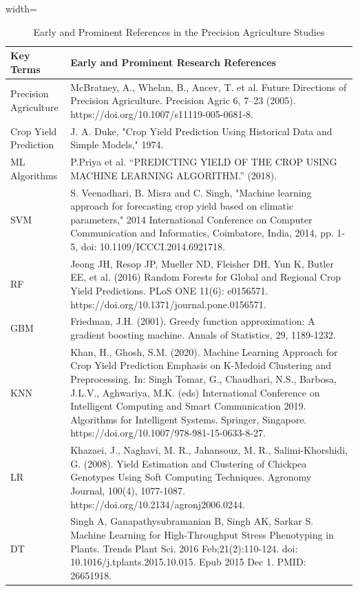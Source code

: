 \documentclass[conference]{IEEEtran}
\begin{document}
\begin{table}[htbp]
\centering
\caption{Early and Prominent References in the Precision Agriculture Studies}
\begin{adjustbox}{width=\textwidth}
\begin{tabular}{|p{2cm}|p{14cm}|}
\hline
\textbf{Key Terms} & \textbf{Early and Prominent Research References} \\
\hline
Precision Agriculture & McBratney, A., Whelan, B., Ancev, T. et al. Future Directions of Precision Agriculture. Precision Agric 6, 7–23 (2005). https://doi.org/10.1007/s11119-005-0681-8. \\
\hline
Crop Yield Prediction & J. A. Duke, "Crop Yield Prediction Using Historical Data and Simple Models," 1974. \\
\hline
ML Algorithms & P.Priya et al. “PREDICTING YIELD OF THE CROP USING MACHINE LEARNING ALGORITHM.” (2018).\\
\hline
SVM & S. Veenadhari, B. Misra and C. Singh, "Machine learning approach for forecasting crop yield based on climatic parameters," 2014 International Conference on Computer Communication and Informatics, Coimbatore, India, 2014, pp. 1-5, doi: 10.1109/ICCCI.2014.6921718.\\
\hline
RF & Jeong JH, Resop JP, Mueller ND, Fleisher DH, Yun K, Butler EE, et al. (2016) Random Forests for Global and Regional Crop Yield Predictions. PLoS ONE 11(6): e0156571. https://doi.org/10.1371/journal.pone.0156571. \\
\hline
GBM & Friedman, J.H. (2001). Greedy function approximation: A gradient boosting machine. Annals of Statistics, 29, 1189-1232. \\
\hline
KNN & Khan, H., Ghosh, S.M. (2020). Machine Learning Approach for Crop Yield Prediction Emphasis on K-Medoid Clustering and Preprocessing. In: Singh Tomar, G., Chaudhari, N.S., Barbosa, J.L.V., Aghwariya, M.K. (eds) International Conference on Intelligent Computing and Smart Communication 2019. Algorithms for Intelligent Systems. Springer, Singapore. https://doi.org/10.1007/978-981-15-0633-8-27.\\
\hline
LR & Khazaei, J., Naghavi, M. R., Jahansouz, M. R., Salimi-Khorshidi, G. (2008). Yield Estimation and Clustering of Chickpea Genotypes Using Soft Computing Techniques. Agronomy Journal, 100(4), 1077-1087. https://doi.org/10.2134/agronj2006.0244.\\
\hline
DT & Singh A, Ganapathysubramanian B, Singh AK, Sarkar S. Machine Learning for High-Throughput Stress Phenotyping in Plants. Trends Plant Sci. 2016 Feb;21(2):110-124. doi: 10.1016/j.tplants.2015.10.015. Epub 2015 Dec 1. PMID: 26651918.\\

\end{tabular}
\end{adjustbox}
\end{table}
\end{document}
